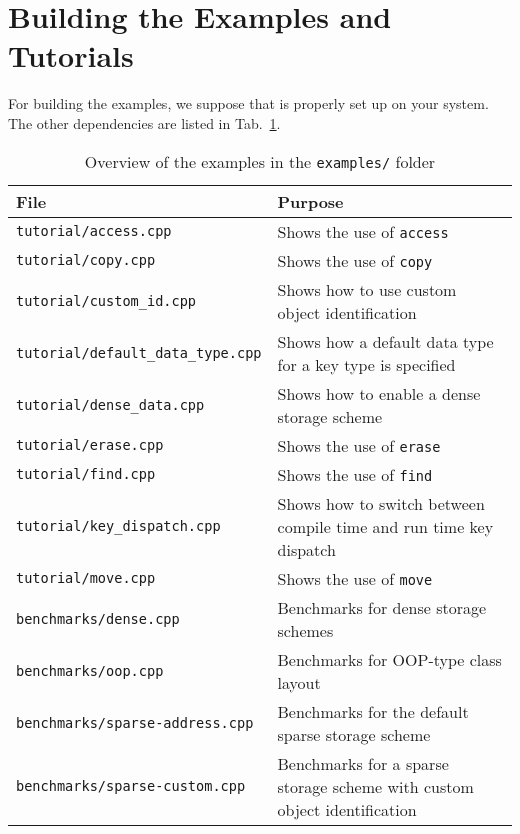 \section{Building the Examples and Tutorials}
For building the examples, we suppose that {\CMake} is properly set up
on your system. The other dependencies are listed in
Tab.~\ref{tab:tutorial-dependencies}.

\begin{table}[tb]
\begin{center}
\begin{tabular}{l|p{8.5cm}}
File & Purpose\\
\hline
\texttt{tutorial/access.cpp}    & Shows the use of \lstinline|access| \\
\texttt{tutorial/copy.cpp}      & Shows the use of \lstinline|copy| \\
\texttt{tutorial/custom\_id.cpp} & Shows how to use custom object identification \\
\texttt{tutorial/default\_data\_type.cpp} & Shows how a default data type for a key type is specified \\
\texttt{tutorial/dense\_data.cpp} & Shows how to enable a dense storage scheme \\
\texttt{tutorial/erase.cpp}     & Shows the use of \lstinline|erase| \\
\texttt{tutorial/find.cpp}      & Shows the use of \lstinline|find| \\
\texttt{tutorial/key\_dispatch.cpp} & Shows how to switch between compile time and run time key dispatch \\
\texttt{tutorial/move.cpp}      & Shows the use of \lstinline|move| \\
\texttt{benchmarks/dense.cpp}   & Benchmarks for dense storage schemes \\
\texttt{benchmarks/oop.cpp}     & Benchmarks for OOP-type class layout \\
\texttt{benchmarks/sparse-address.cpp} & Benchmarks for the default sparse storage scheme \\
\texttt{benchmarks/sparse-custom.cpp}  & Benchmarks for a sparse storage scheme with custom object identification \\
\end{tabular}
\caption{Overview of the examples in the \texttt{examples/} folder}
\label{tab:tutorial-dependencies}
\end{center}
\end{table}

